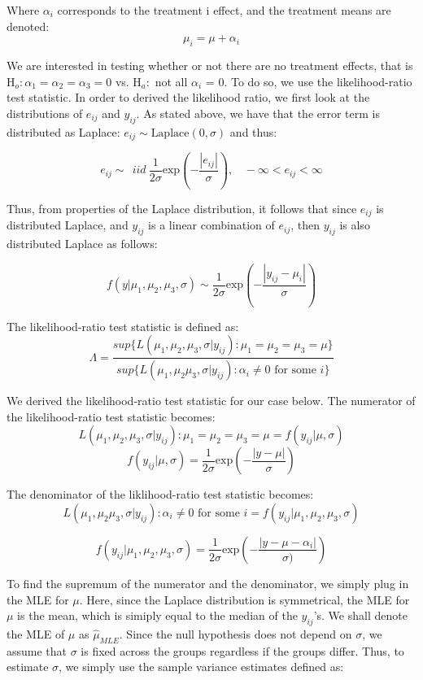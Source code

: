 \documentclass[12pt]{article}
\begin{document}
\begin{description}
\begin{itemize}
Where $\alpha_i$ corresponds to the treatment i effect, and the treatment means are denoted:
\[\mu_i = \mu +  \alpha_i\]

We are interested in testing whether or not there are no treatment effects, that is $\text{H}_o: \alpha_1 = \alpha_2 = \alpha_3 = 0$ vs. $\text{H}_a:$ not all $\alpha_i$ = 0. To do so, we use the likelihood-ratio test statistic. In order to derived the likelihood ratio, we first look at the distributions of $e_{ij}$ and $y_{ij}$. As stated above, we have that the error term is distributed as Laplace: $e_{ij} \sim \text{Laplace}(0, \sigma)$ and thus: 

\[e_{ij} \sim \ \ iid \ \frac{1}{2\sigma} \mathrm{exp} \left(- \frac{|e_{ij}|}{\sigma} \right), \ \ \ \ -\infty < e_{ij} < \infty\]

Thus, from properties of the Laplace distribution, it follows that since $e_{ij}$ is distributed Laplace, and $y_{ij}$ is a linear combination of $e_{ij}$, then $y_{ij}$ is also distributed Laplace as follows:

\[f(y|\mu_1, \mu_2, \mu_3, \sigma) \sim \frac{1}{2\sigma} \mathrm{exp} \left( -\frac{|y_{ij} - \mu_i|}{\sigma}\right)  \]

The likelihood-ratio test statistic is defined as:
\[\Lambda = \frac{sup\{L(\mu_1, \mu_2, \mu_3, \sigma| y_{ij}) : \mu_1 = \mu_2 = \mu_3 = \mu\}}{sup\{L(\mu_1, \mu_2 \mu_3, \sigma| y_{ij}) : \alpha_i \neq 0 \text{ for some } i\} }\]

We derived the likelihood-ratio test statistic for our case below. The numerator of the likelihood-ratio test statistic becomes:
\[L(\mu_1, \mu_2, \mu_3, \sigma| y_{ij}) : \mu_1 = \mu_2 = \mu_3 = \mu = f(y_{ij} | \mu, \sigma)\]
\[f(y_{ij} | \mu, \sigma)  = \frac{1}{2\sigma} \mathrm{exp} \left(-\frac{|y - \mu|}{\sigma} \right)\]

The denominator of the liklihood-ratio test statistic becomes:
\[L(\mu_1, \mu_2 \mu_3, \sigma| y_{ij}) : \alpha_i \neq 0 \text{ for some } i = f(y_{ij} | \mu_1, \mu_2, \mu_3, \sigma)\]

\[f(y_{ij} | \mu_1, \mu_2, \mu_3, \sigma) = \frac{1}{2\sigma} \mathrm{exp} \left( - \frac{|y - \mu - \alpha_i|}{\sigma)}\right)\]

To find the supremum of the numerator and the denominator, we simply plug in the MLE for $\mu$. Here, since the Laplace distribution is symmetrical, the MLE for $\mu$ is the mean, which is simiply equal to the median of the $y_{ij}$'s. We shall denote the MLE of $\mu$ as $\hat{\mu}_{MLE}$. Since the null hypothesis does not depend on $\sigma$, we assume that $\sigma$ is fixed across the groups regardless if the groups differ. Thus, to estimate $\sigma$, we simply use the sample variance estimates defined as:


\end{itemize}
\end{description}
\end{document}
